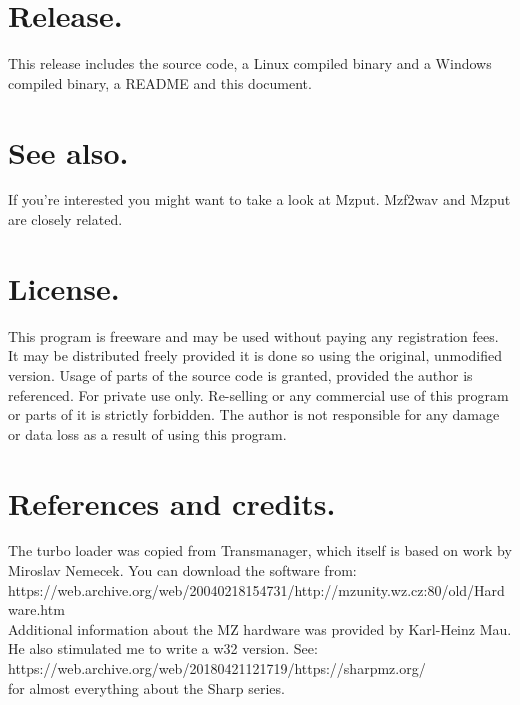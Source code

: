 \documentclass{article}
\begin{document}
\section{Release.}
This release includes the source code, a Linux compiled binary and a Windows 
compiled binary, a README and this document. 

\section{See also.}
If you're interested you might want to take a look at Mzput. Mzf2wav and Mzput
are closely related.

\section{License.}
This program is freeware and may be used without paying any registration fees.
It may be distributed freely provided it is done so using the original, 
unmodified version. Usage of parts of the source code is granted, provided the 
author is referenced. For private use only. Re-selling or any commercial use of
this program or parts of it is strictly forbidden. The author is not 
responsible for any damage or data loss as a result of using this program.

\section{References and credits.}
The turbo loader was copied from Transmanager, which itself is based on work 
by Miroslav Nemecek. You can download the software from: \\
https://web.archive.org/web/20040218154731/http://mzunity.wz.cz:80/old/Hardware.htm \\
Additional information about the MZ hardware was provided by Karl-Heinz Mau. 
He also stimulated me to write a w32 version. See: \\
https://web.archive.org/web/20180421121719/https://sharpmz.org/ \\ 
for almost everything about the Sharp series.
\end{document}
